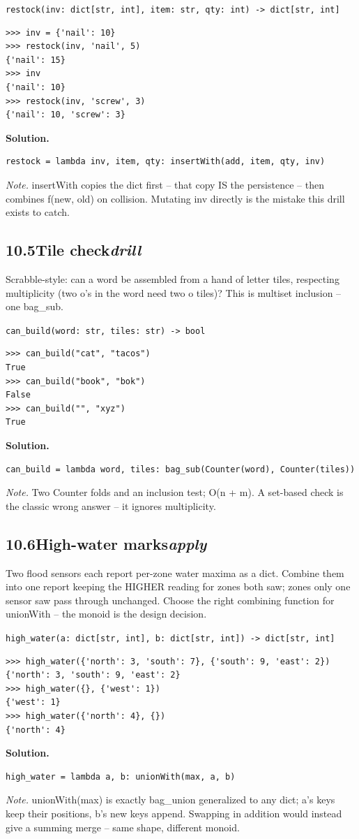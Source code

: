 \documentclass[10pt,letterpaper]{book}
\begin{document}
\noindent\texttt{restock(inv: dict[str, int], item: str, qty: int) -> dict[str, int]}
\begin{lstlisting}[style=ex]
>>> inv = {'nail': 10}
>>> restock(inv, 'nail', 5)
{'nail': 15}
>>> inv
{'nail': 10}
>>> restock(inv, 'screw', 3)
{'nail': 10, 'screw': 3}
\end{lstlisting}
\noindent\textbf{Solution.}
\begin{lstlisting}[style=code]
restock = lambda inv, item, qty: insertWith(add, item, qty, inv)
\end{lstlisting}
\noindent\textit{Note.} insertWith copies the dict first -- that copy IS the persistence -- then combines f(new, old) on collision. Mutating inv directly is the mistake this drill exists to catch.

\subsection*{10.5\quad Tile check\hfill\textnormal{\textit{drill}}}
Scrabble-style: can a word be assembled from a hand of letter tiles, respecting multiplicity (two o's in the word need two o tiles)? This is multiset inclusion -- one bag\_sub.

\noindent\texttt{can\_build(word: str, tiles: str) -> bool}
\begin{lstlisting}[style=ex]
>>> can_build("cat", "tacos")
True
>>> can_build("book", "bok")
False
>>> can_build("", "xyz")
True
\end{lstlisting}
\noindent\textbf{Solution.}
\begin{lstlisting}[style=code]
can_build = lambda word, tiles: bag_sub(Counter(word), Counter(tiles))
\end{lstlisting}
\noindent\textit{Note.} Two Counter folds and an inclusion test; O(n + m). A set-based check is the classic wrong answer -- it ignores multiplicity.

\subsection*{10.6\quad High-water marks\hfill\textnormal{\textit{apply}}}
Two flood sensors each report per-zone water maxima as a dict. Combine them into one report keeping the HIGHER reading for zones both saw; zones only one sensor saw pass through unchanged. Choose the right combining function for unionWith -- the monoid is the design decision.

\noindent\texttt{high\_water(a: dict[str, int], b: dict[str, int]) -> dict[str, int]}
\begin{lstlisting}[style=ex]
>>> high_water({'north': 3, 'south': 7}, {'south': 9, 'east': 2})
{'north': 3, 'south': 9, 'east': 2}
>>> high_water({}, {'west': 1})
{'west': 1}
>>> high_water({'north': 4}, {})
{'north': 4}
\end{lstlisting}
\noindent\textbf{Solution.}
\begin{lstlisting}[style=code]
high_water = lambda a, b: unionWith(max, a, b)
\end{lstlisting}
\noindent\textit{Note.} unionWith(max) is exactly bag\_union generalized to any dict; a's keys keep their positions, b's new keys append. Swapping in addition would instead give a summing merge -- same shape, different monoid.
\end{document}
